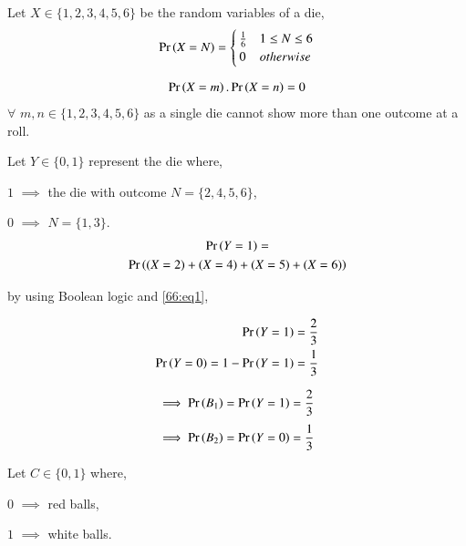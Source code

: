 Let $X \in \{1,2,3,4,5,6\}$ be the random variables of a die,
\begin{align}
    \Pr\left(X=N\right) =
    \begin{cases}
    \frac{1}{6} & 1 \leq N \leq 6\\
    0 & otherwise
    \end{cases}
\end{align}

\begin{align}\label{66:eq1}
    \pr{X=m}.\pr{X=n}=0
\end{align}
$\forall$ $m,n \in \{1,2,3,4,5,6\}$ as a single die cannot show more than one outcome at a roll.

Let $Y \in \{0, 1\}$ represent the die where,

$1$ $\implies$ the die with outcome $N = \{ 2, 4, 5, 6\}$,

$0$ $\implies$ $N = \{ 1, 3\}$.
\begin{multline}
    \Pr\left(Y=1\right)=\\
    \Pr\left((X=2)+(X=4)+(X=5)+(X=6)\right)
\end{multline}

by using Boolean logic and \eqref{66:eq1},

\begin{align}
    \Pr\left(Y=1\right)=\frac{2}{3}\\
    \Pr\left(Y=0\right)=1-\Pr\left(Y=1\right)=\frac{1}{3}
\end{align}

\begin{align}\label{66:eq2}
    \implies\pr{B_1}=\pr{Y=1}=\frac{2}{3}
\end{align}
\begin{align}\label{66:eq3}
    \implies\pr{B_2}=\pr{Y=0}=\frac{1}{3}
\end{align}

Let $C \in \{0,1\}$ where, 

$0$ $\implies$ red balls,

$1$ $\implies$ white balls.

\begin{table}[h!]
\centering
\caption{Table of number of balls}
\label{66:table1}
\end{table}

